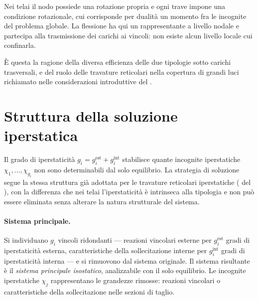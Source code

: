 	Nei telai il nodo possiede una rotazione propria e ogni
	trave impone una condizione rotazionale, cui corrisponde
	per dualità un momento fra le incognite del problema
	globale. La flessione ha qui un rappresentante a livello
	nodale e partecipa alla trasmissione dei carichi ai
	vincoli: non esiste alcun livello locale cui confinarla.
	
	È questa la ragione della diversa efficienza delle due
	tipologie sotto carichi trasversali, e del ruolo delle
	travature reticolari nella copertura di grandi luci
	richiamato nelle considerazioni introduttive del
	.

\section{Struttura della soluzione iperstatica}
\label{sec:telai_iperstatica}

Il grado di iperstaticità $g_i = g_i^{\text{est}} + 
g_i^{\text{int}}$ stabilisce quante incognite 
iperstatiche $\chi_1, \ldots, \chi_{g_i}$ non sono 
determinabili dal solo equilibrio. La strategia di 
soluzione segue la stessa struttura già adottata per 
le travature reticolari iperstatiche 
( del 
), con la differenza che 
nei telai l'iperstaticità è intrinseca alla tipologia 
e non può essere eliminata senza alterare la natura 
strutturale del sistema.

\paragraph{Sistema principale.}
Si individuano $g_i$ vincoli ridondanti --- reazioni 
vincolari esterne per $g_i^{\text{est}}$ gradi di 
iperstaticità esterna, caratteristiche della 
sollecitazione interne per $g_i^{\text{int}}$ gradi 
di iperstaticità interna --- e si rimuovono dal 
sistema originale. Il sistema risultante è il 
\emph{sistema principale isostatico}, analizzabile 
con il solo equilibrio. Le incognite iperstatiche 
$\chi_j$ rappresentano le grandezze rimosse: reazioni 
vincolari o caratteristiche della sollecitazione nelle 
sezioni di taglio.

